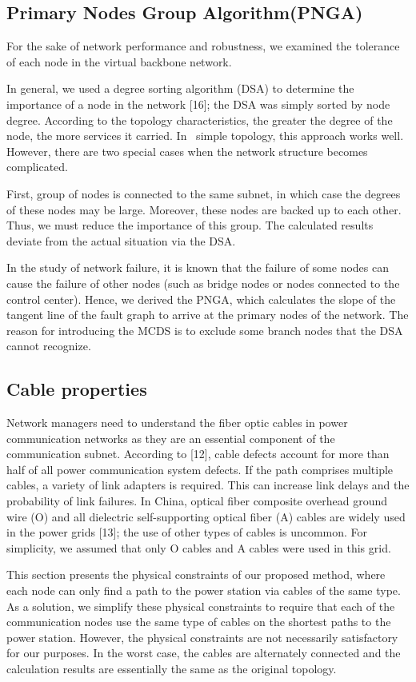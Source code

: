 \documentclass[AMA,STIX1COL]{WileyNJD-v2}
\begin{document}
\subsection{Primary Nodes Group Algorithm(PNGA)}
\par For the sake of network performance and robustness, we examined the tolerance of each node in the virtual backbone network.
\par In general, we used a degree sorting algorithm (DSA) to determine the importance of a node in the network [16]; the DSA was simply sorted by node degree. According to the topology characteristics, the greater the degree of the node, the more services it carried. In \ simple topology, this approach works well. However, there are two special cases when the network structure becomes complicated.
\par First, group of nodes is connected to the same subnet, in which case the degrees of these nodes may be large. Moreover, these nodes are backed up to each other. Thus, we must reduce the importance of this group. The calculated results deviate from the actual situation via the DSA. 
\par In the study of network failure, it is known that the failure of some nodes can cause the failure of other nodes (such as bridge nodes or nodes connected to the control center). Hence, we derived the PNGA, which calculates the slope of the tangent line of the fault graph to arrive at the primary nodes of the network. The reason for introducing the MCDS is to exclude some branch nodes that the DSA cannot recognize. 
\subsection{Cable properties}
\par Network managers need to understand the fiber optic cables in power communication networks as they are an essential component of the communication subnet. According to [12], cable defects account for more than half of all power communication system defects. If the path comprises multiple cables, a variety of link adapters is required. This can increase link delays and the probability of link failures. In China, optical fiber composite overhead ground wire (O) and all dielectric self-supporting optical fiber (A) cables are widely used in the power grids [13]; the use of other types of cables is uncommon. For simplicity, we assumed that only O cables and A cables were used in this grid.

\par This section presents the physical constraints of our proposed method, where each node can only find a path to the power station via cables of the same type. As a solution, we simplify these physical constraints to require that each of the communication nodes use the same type of cables on the shortest paths to the power station.
However, the physical constraints are not necessarily satisfactory for our purposes. In the worst case, the cables are alternately connected and the calculation results are essentially the same as the original topology.
\end{document}
